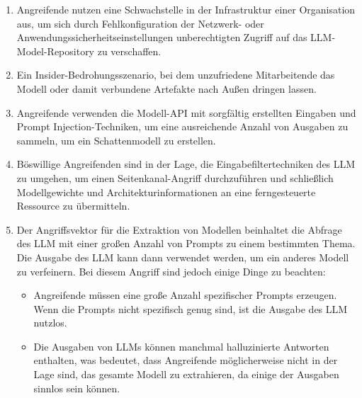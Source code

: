 \documentclass[
]{article}
\providecommand{\tightlist}{%
  \setlength{\itemsep}{0pt}\setlength{\parskip}{0pt}}
\begin{document}
\begin{enumerate}
\def\labelenumi{\arabic{enumi}.}
\tightlist
\item
  Angreifende nutzen eine Schwachstelle in der Infrastruktur einer
  Organisation aus, um sich durch Fehlkonfiguration der Netzwerk- oder
  Anwendungssicherheitseinstellungen unberechtigten Zugriff auf das
  LLM-Model-Repository zu verschaffen.
\item
  Ein Insider-Bedrohungsszenario, bei dem unzufriedene Mitarbeitende das
  Modell oder damit verbundene Artefakte nach Außen dringen lassen.
\item
  Angreifende verwenden die Modell-API mit sorgfältig erstellten
  Eingaben und Prompt Injection-Techniken, um eine ausreichende Anzahl
  von Ausgaben zu sammeln, um ein Schattenmodell zu erstellen.
\item
  Böswillige Angreifenden sind in der Lage, die Eingabefiltertechniken
  des LLM zu umgehen, um einen Seitenkanal-Angriff durchzuführen und
  schließlich Modellgewichte und Architekturinformationen an eine
  ferngesteuerte Ressource zu übermitteln.
\item
  Der Angriffsvektor für die Extraktion von Modellen beinhaltet die
  Abfrage des LLM mit einer großen Anzahl von Prompts zu einem
  bestimmten Thema. Die Ausgabe des LLM kann dann verwendet werden, um
  ein anderes Modell zu verfeinern. Bei diesem Angriff sind jedoch
  einige Dinge zu beachten:

  \begin{itemize}
  \tightlist
  \item
    Angreifende müssen eine große Anzahl spezifischer Prompts erzeugen.
    Wenn die Prompts nicht spezifisch genug sind, ist die Ausgabe des
    LLM nutzlos.
  \item
    Die Ausgaben von LLMs können manchmal halluzinierte Antworten
    enthalten, was bedeutet, dass Angreifende möglicherweise nicht in
    der Lage sind, das gesamte Modell zu extrahieren, da einige der
    Ausgaben sinnlos sein können.


\end{itemize}
\end{enumerate}
\end{document}
